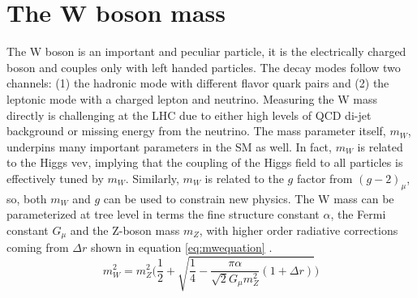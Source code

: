 

\section{The W boson mass}

The W boson is an important and peculiar particle, it is the electrically charged boson and couples only with left handed particles. The decay modes follow two channels: (1) the hadronic mode with different flavor quark pairs and (2) the leptonic mode with a charged lepton and neutrino. Measuring the W mass directly is challenging at the LHC due to either high levels of QCD di-jet background or missing energy from the neutrino. The mass parameter itself, $m_W$, underpins many important parameters in the SM as well. In fact, $m_W$ is related to the Higgs vev, implying that the coupling of the Higgs field to all particles is effectively tuned by $m_W$. Similarly, $m_W$ is related to the $g$ factor from $(g-2)_\mu$, so, both $m_W$ and $g$ can be used to constrain new physics. The W mass can be parameterized at tree level in terms the fine structure constant $\alpha$, the Fermi constant $G_\mu$ and the Z-boson mass $m_Z$, with higher order radiative corrections coming from $\Delta r$ shown in equation \ref{eq:mwequation} \cite{Awramik:2003rn}.
\begin{equation}
\label{eq:mwequation}
m_W^2 = m_Z^2\Bigg(\frac{1}{2} + \sqrt{\frac{1}{4} - \frac{\pi\alpha}{\sqrt{2}G_\mu m_{Z}^2 }(1+\Delta r) } \Bigg)
\end{equation}

